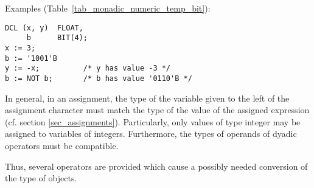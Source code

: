Examples (Table~\ref{tab_monadic_numeric_temp_bit}):

\begin{lstlisting}
DCL (x, y)  FLOAT,  
     b      BIT(4);
x := 3;           
b := '1001'B     
y := -x;          /* y has value -3 */
b := NOT b;       /* b has value '0110'B */
\end{lstlisting}

In general, in an assignment, the type of the variable given to the left
of the assignment character must match the type of the value of the
assigned expression (cf. section \ref{sec_assignments}).
 Particularly, only values of type
integer may be assigned to variables of integers. Furthermore, the types
of operands of dyadic operators must be compatible.

Thus, several operators are provided which cause a possibly needed
conversion of the type of objects.

